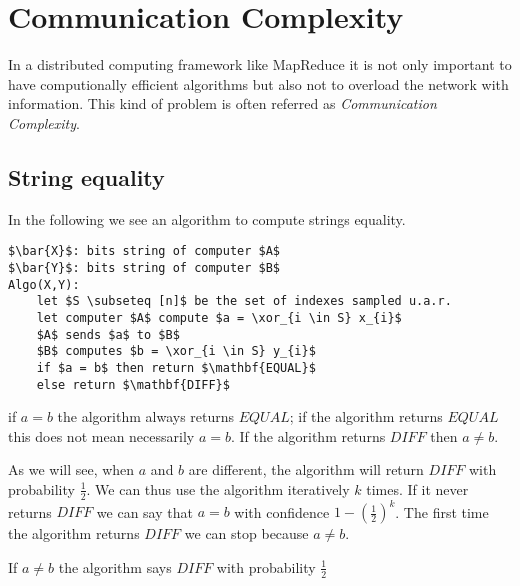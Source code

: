 \chapter{Communication Complexity}\label{ch:comm-complex}

In a distributed computing framework like MapReduce it is not only important to have computionally efficient algorithms but also not to overload the network with information. This kind of problem is often referred as \emph{Communication Complexity}.

\section{String equality}\label{sec:string-eq}
In the following we see an algorithm to compute strings equality.

\begin{lstlisting}[caption={Greedy algorithm},label={lst:fS-greedy}]
$\bar{X}$: bits string of computer $A$
$\bar{Y}$: bits string of computer $B$
Algo(X,Y):
    let $S \subseteq [n]$ be the set of indexes sampled u.a.r.
    let computer $A$ compute $a = \xor_{i \in S} x_{i}$
    $A$ sends $a$ to $B$
    $B$ computes $b = \xor_{i \in S} y_{i}$
    if $a = b$ then return $\mathbf{EQUAL}$
    else return $\mathbf{DIFF}$
\end{lstlisting}

\begin{obs}
if $a = b$ the algorithm always returns $EQUAL$; if the algorithm returns $EQUAL$ this does not mean necessarily $a = b$. If the algorithm returns $DIFF$ then $a \neq b$.
\end{obs}

As we will see, when $a$ and $b$ are different, the algorithm will return $DIFF$ with probability $\frac{1}{2}$.
We can thus use the algorithm iteratively $k$ times. If it never returns $DIFF$ we can say that $a = b$ with confidence $1 - (\frac{1}{2})^k$. The first time the algorithm returns $DIFF$ we can stop because $a \neq b$.

\begin{thm}
    If $a \neq b$ the algorithm says $DIFF$ with probability $\frac{1}{2}$
\end{thm}

